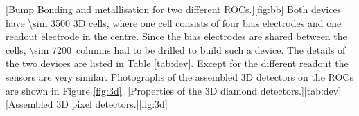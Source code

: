 [Bump Bonding and metallisation for two different \acp{ROC}.][fig:bb]
Both devices have \SI{\sim 3500}{} 3D cells, where one cell consists of four bias electrodes and one readout electrode in the centre. Since the bias electrodes are shared between the cells, \SI{\sim 7200}{columns} had to be drilled to build such a device. The details of the two devices are listed in Table \vref{tab:dev}. Except for the different readout the sensors are very similar. Photographs of the assembled 3D detectors on the \acp{ROC} are shown in Figure \ref{fig:3d}. 
\small{
  [Properties of the 3D diamond detectors.][tab:dev]}
[Assembled 3D pixel detectors.][fig:3d]